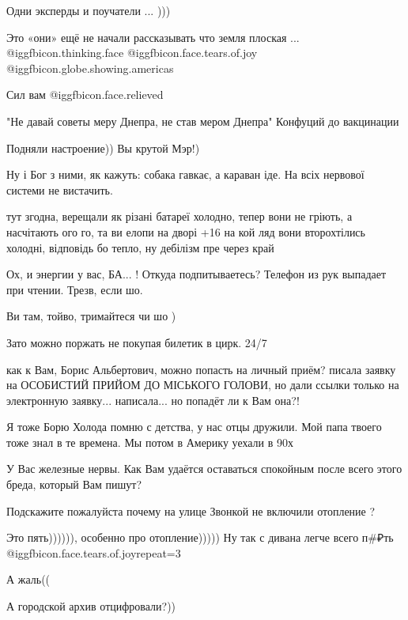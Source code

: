 \begin{itemize}
Одни эксперды и поучатели ... )))

Это «они» ещё не начали рассказывать что земля плоская ...
@igg{fbicon.thinking.face}  @igg{fbicon.face.tears.of.joy}  @igg{fbicon.globe.showing.americas} 

Сил вам @igg{fbicon.face.relieved} 

"Не давай советы меру Днепра, не став мером Днепра"
Конфуций до вакцинации

Подняли настроение)) Вы крутой Мэр!)

Ну і Бог з ними, як кажуть: собака гавкає, а караван іде. На всіх нервової системи не вистачить.


тут згодна, верещали як різані батареї холодно, тепер вони не гріють, а насчітають
ого го, та ви елопи на дворі +16 на кой ляд вони второхтілись холодні, відповідь
бо тепло, ну дебілізм пре через край

Ох, и энергии у вас, БА... ! Откуда подпитываетесь?
Телефон из рук выпадает при чтении.
Трезв, если шо.

Ви там, тойво, тримайтеся чи шо )

Зато можно поржать не покупая билетик в цирк. 24/7


как к Вам, Борис Альбертович, можно попасть на личный приём? писала заявку на
ОСОБИСТИЙ ПРИЙОМ ДО МІСЬКОГО ГОЛОВИ, но дали ссылки только на электронную
заявку... написала... но попадёт ли к Вам она?!

Я тоже Борю Холода помню с детства, у нас отцы дружили. Мой папа твоего тоже знал в те времена. Мы потом в Америку уехали в 90х

У Вас железные нервы. Как Вам удаётся оставаться спокойным после всего этого бреда, который Вам пишут?

Подскажите пожалуйста почему на улице Звонкой не включили отопление ?

Это пять)))))), особенно про отопление)))))
Ну так с дивана легче всего п\#₽ть @igg{fbicon.face.tears.of.joy}{repeat=3} 

А жаль((

А городской архив отцифровали?))


\end{itemize}
